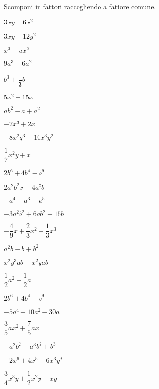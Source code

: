 \begin{esercizio}
\label{ese:div.010}
Scomponi in fattori raccogliendo a fattore comune.
\begin{htmulticols}{3}
\begin{enumeratea}
\item \(3xy+6x^{2}\)
\item \(3xy-12y^{2}\)
\item \(x^{3}-ax^{2}\)
\item \(9a^{3}-6a^{2}\)
\item \(b^{3}+\dfrac{1}{3}b\)
\item \(5x^{2}-15x\)
\item \(ab^{2}-a+a^{2}\)
\item \(-2x^{3}+2x\)
\item \(-8x^{2}y^{3}-10x^{3}y^{2}\)
\item \(\dfrac{1}{7}x^{2}y+x\)
\item \(2b^{6}+4b^{4}-b^{9}\)
\item \(2a^{2}b^{2}x-4a^{2}b\)
\item \(-a^{4}-a^{3}-a^{5}\)
\item \(-3a^{2}b^{2}+6ab^{2}-15b\)
\item \(-{\dfrac{4}{9}}x+\dfrac{2}{3}x^{2}-\dfrac{1}{3}x^{3}\)
\item \(a^{2}b-b+b^{2}\)
\item \(x^{2}y^{3}ab-x^{2}yab\)
\item \(\dfrac{1}{2}a^{2}+\dfrac{1}{2}a\)
\item \(2b^{6}+4b^{4}-b^{9}\)
\item \(-5a^{4}-10a^{2}-30a\)
\item \(\dfrac{3}{5}ax^{2}+\dfrac{7}{5}ax\)
\item \(-a^{2}b^{2}-a^{3}b^{5}+b^{3}\)
\item \(-2x^{6}+4x^{5}-6x^{3}y^{9}\)
\item \(\dfrac{3}{4}x^{3}y+\dfrac{1}{2}x^{2}y-xy\)
\end{enumeratea}
\end{htmulticols}
\end{esercizio}


